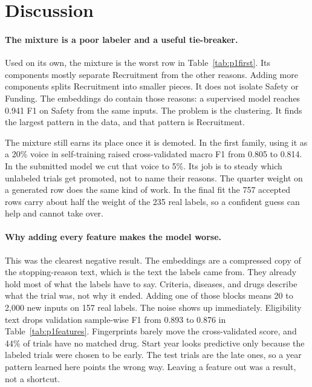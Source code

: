 \section{Discussion}
\label{sec:discussion}

\paragraph{The mixture is a poor labeler and a useful tie-breaker.}
Used on its own, the mixture is the worst row in Table~\ref{tab:p1first}. Its
components mostly separate Recruitment from the other reasons. Adding more
components splits Recruitment into smaller pieces. It does not isolate Safety or
Funding. The embeddings do contain those reasons: a supervised model reaches
0.941 F1 on Safety from the same inputs. The problem is the clustering. It finds
the largest pattern in the data, and that pattern is Recruitment.

The mixture still earns its place once it is demoted. In the first family, using
it as a 20\% voice in self-training raised cross-validated macro F1 from 0.805 to
0.814. In the submitted model we cut that voice to 5\%. Its job is to steady
which unlabeled trials get promoted, not to name their reasons. The quarter
weight on a generated row does the same kind of work. In the final fit the 757
accepted rows carry about half the weight of the 235 real labels, so a confident
guess can help and cannot take over.

\paragraph{Why adding every feature makes the model worse.}
This was the clearest negative result. The embeddings are a compressed copy of
the stopping-reason text, which is the text the labels came from. They already
hold most of what the labels have to say. Criteria, diseases, and drugs describe
what the trial was, not why it ended. Adding one of those blocks means 20 to
2,000 new inputs on 157 real labels. The noise shows up immediately. Eligibility
text drops validation sample-wise F1 from 0.893 to 0.876 in
Table~\ref{tab:p1features}. Fingerprints barely move the cross-validated score,
and 44\% of trials have no matched drug. Start year looks predictive only because
the labeled trials were chosen to be early. The test trials are the late ones,
so a year pattern learned here points the wrong way. Leaving a feature out was a
result, not a shortcut.


